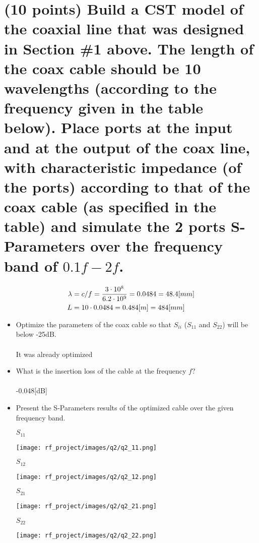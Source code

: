 \documentclass[12pt, letterpaper]{article}
\begin{document}
\section{(10 points) Build a CST model of the coaxial line that was designed in Section \#1 above. The length of the coax cable should be 10 wavelengths (according to the frequency given in the table below). Place ports at the input and at the output of the coax line, with characteristic impedance (of the ports) according to that of the coax cable (as specified in the table) and simulate the 2 ports S-Parameters over the frequency band of $0.1f - 2f$.}

\begin{align}
  \lambda
  &=
  c/f
  =
  {3\cdot10^8\over 6.2\cdot10^9}
  =
  0.0484
  =
  48.4[mm]
  \\
  L&=
  10\cdot0.0484
  =
  0.484[m]
  =
  484[mm]
\end{align}



\begin{itemize}
  \item Optimize the parameters of the coax cable so that $S_{ii}$ ($S_{11}$ and $S_{22}$) will be below -25dB.
  \\\\
  {\color{blue}It was already optimized}
  \item What is the insertion loss of the cable at the frequency $f$?
  \\\\
  {\color{blue}-0.048[dB]}
  \item Present the S-Parameters results of the optimized cable over the given frequency band.
  \begin{center}
    $S_{11}$
  \end{center}
  \texttt{[image: rf\_project/images/q2/q2\_11.png]}
  \pagebreak
  \begin{center}
    $S_{12}$
  \end{center}
  \texttt{[image: rf\_project/images/q2/q2\_12.png]}
  \begin{center}
    $S_{21}$
  \end{center}
  \texttt{[image: rf\_project/images/q2/q2\_21.png]}
  \begin{center}
    $S_{22}$
  \end{center}
  \texttt{[image: rf\_project/images/q2/q2\_22.png]}
\end{itemize}
\end{document}
